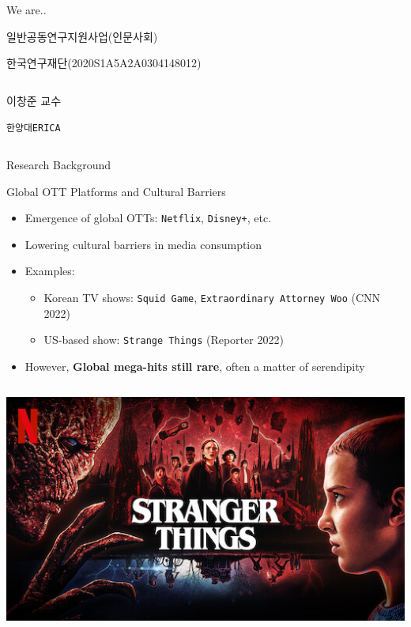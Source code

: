 \documentclass[
  ignorenonframetext,
]{beamer}
\begin{document}
\begin{frame}[fragile]{We are..}
\begin{block}{일반공동연구지원사업(인문사회)}
\begin{block}{한국연구재단(2020S1A5A2A0304148012)}
\begin{columns}[T]
\begin{column}{0.18\textwidth}
\begin{block}{이창준 교수}
\protect\hypertarget{uxc774uxcc3duxc900-uxad50uxc218}{}
\end{block}

\begin{block}{\texttt{한양대ERICA}}
\protect\hypertarget{uxd55cuxc591uxb300erica}{}
\end{block}
\end{column}

\begin{column}{0.23\textwidth}
\end{column}
\end{columns}
\end{block}
\end{block}
\end{frame}

\begin{frame}[fragile]{Research Background}
\protect\hypertarget{research-background}{}
\begin{block}{Global OTT Platforms and Cultural Barriers}
\protect\hypertarget{global-ott-platforms-and-cultural-barriers}{}
\begin{itemize}
\item
  Emergence of global OTTs: \texttt{Netflix}, \texttt{Disney+}, etc.
\item
  Lowering cultural barriers in media consumption
\item
  Examples:

  \begin{itemize}
  \item
    Korean TV shows: \texttt{Squid\ Game},
    \texttt{Extraordinary\ Attorney\ Woo} (CNN 2022)
  \item
    US-based show: \texttt{Strange\ Things} (Reporter 2022)
  \end{itemize}
\item
  However, \textbf{Global mega-hits still rare}, often a matter of
  serendipity
\end{itemize}

\begin{columns}[T]
\begin{column}{0.5\textwidth}
\includegraphics[width=8.33333in,height=\textheight]{img/ott_3.jpg}
\end{column}


\end{columns}
\end{block}
\end{frame}
\end{document}
